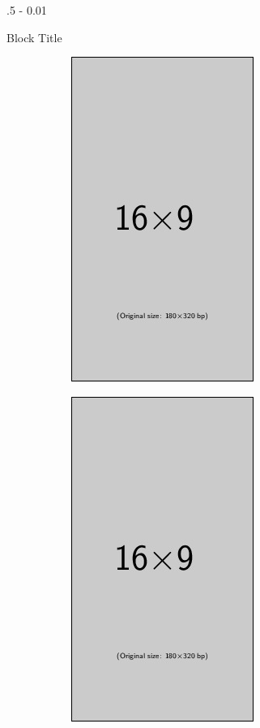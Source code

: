 \documentclass{postertheme}\usepackage[]{graphicx}\usepackage[]{color}
\begin{document}
\begin{frame}
\begin{columns}[onlytextwidth]
\begin{column}{.5 \textwidth - 0.01 \textwidth}
\begin{block}{Block Title}
\begin{figure}
\begin{minipage}{0.2 \linewidth}
        \end{minipage}
        \hskip0.45in
        \begin{minipage}{0.2 \linewidth}
          \begin{figure}
            \includegraphics[scale=1]{figures/example-image-9x16.jpg}
          \end{figure}
        \end{minipage}
        \hskip0.45in
        \begin{minipage}{0.2 \linewidth}
          \begin{figure}
            \includegraphics[scale=1]{figures/example-image-9x16.jpg}
          \end{figure}
        \end{minipage}


\end{figure}
\end{block}
\end{column}
\end{columns}
\end{frame}
\end{document}
